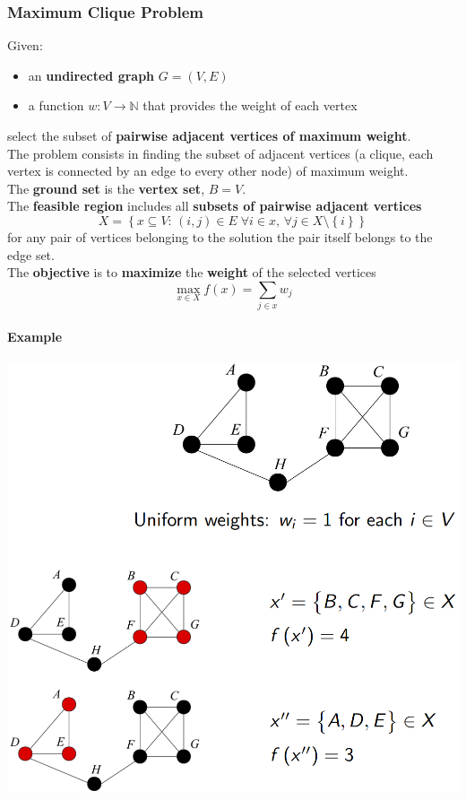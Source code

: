 \documentclass[11pt]{article}
\begin{document}
	\newpage
	
	\subsubsection{Maximum Clique Problem}
	Given:
	\begin{itemize}
		\item an \textbf{undirected graph} $G = (V , E )$
		\item a function $w : V \rightarrow \mathbb{N}$ that provides the weight of each vertex
	\end{itemize}
	select the subset of \textbf{pairwise adjacent vertices of maximum weight}.\\
	The problem consists in finding the subset of adjacent vertices (a clique, each vertex is connected by an edge to every other node) of maximum weight.\\
	
	The \textbf{ground set} is the \textbf{vertex set}, $B = V$.\\
	
	The \textbf{feasible region} includes all \textbf{subsets of pairwise adjacent vertices}
	$$ X = \left\{x \subseteq V : \, (i,j) \in E \; \forall i \in x, \, \forall j \in X \setminus \left\{i\right\}\right\}$$
	for any pair of vertices belonging to the solution the pair itself belongs to the edge set.\\
	
	The \textbf{objective} is to \textbf{maximize} the \textbf{weight} of the selected vertices
	$$ \max_{x \in X} f(x) = \sum_{j \in x} w_j $$
	
	\newpage
	
	\paragraph{Example}
	\begin{center}
		\includegraphics[width=\columnwidth]{img/MCP1}
	\end{center}
	
\end{document}
